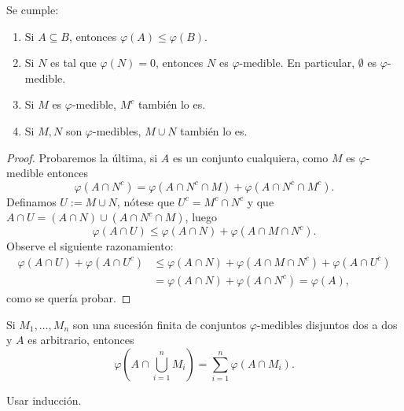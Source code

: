 \begin{prop}
	Se cumple:
	\begin{enumerate}
		\item Si $A\subseteq B$, entonces $\varphi(A) \leq \varphi(B)$.
		\item Si $N$ es tal que $\varphi(N) = 0$, entonces $N$ es $\varphi$-medible.
			En particular, $\emptyset$ es $\varphi$-medible.
		\item Si $M$ es $\varphi$-medible, $M^c$ también lo es.
		\item Si $M,N$ son $\varphi$-medibles, $M\cup N$ también lo es.
	\end{enumerate}
\end{prop}
\begin{proof}
	Probaremos la última, si $A$ es un conjunto cualquiera, como $M$ es $\varphi$-medible entonces
	$$ \varphi(A\cap N^c) = \varphi(A\cap N^c\cap M) + \varphi(A\cap N^c\cap M^c). $$
	Definamos $U := M\cup N$, nótese que $U^c = M^c\cap N^c$ y que $A\cap U = (A\cap N)\cup(A\cap N^c\cap M)$, luego
	$$ \varphi(A\cap U) \le \varphi(A\cap N) + \varphi(A\cap M\cap N^c). $$
	Observe el siguiente razonamiento:
	\begin{align*}
		\varphi(A\cap U) + \varphi(A\cap U^c) &\le \varphi(A\cap N) + \varphi(A\cap M\cap N^c) + \varphi(A\cap U^c) \\
		&= \varphi(A\cap N) + \varphi(A\cap N^c) = \varphi(A),
	\end{align*}
	como se quería probar.
\end{proof}

\begin{lem}
	Si $M_1,\dots,M_n$ son una sucesión finita de conjuntos $\varphi$-medibles disjuntos dos a dos y $A$ es arbitrario, entonces
	$$ \varphi\left( A\cap\bigcup_{i=1}^n M_i \right) = \sum_{i=1}^n \varphi(A\cap M_i). $$
\end{lem}
\begin{hint}
	Usar inducción.
\end{hint}

